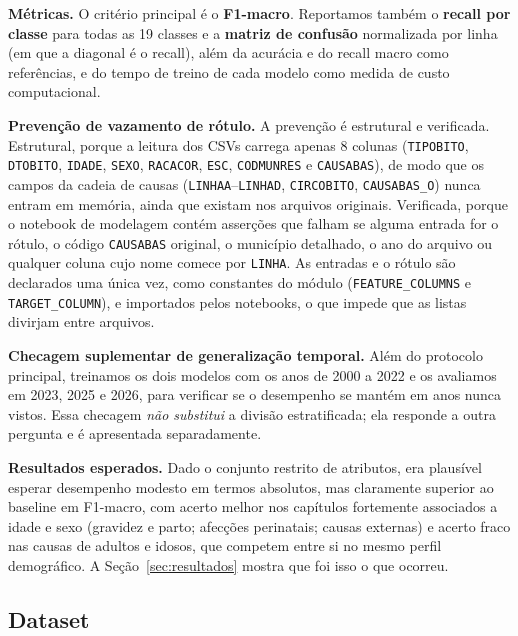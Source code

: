 \documentclass[12pt]{article}
\begin{document}
\textbf{Métricas.} O critério principal é o \textbf{F1-macro}. Reportamos
também o \textbf{recall por classe} para todas as 19 classes e a
\textbf{matriz de confusão} normalizada por linha (em que a diagonal é o
recall), além da acurácia e do recall macro como referências, e do tempo de
treino de cada modelo como medida de custo computacional.

\textbf{Prevenção de vazamento de rótulo.} A prevenção é estrutural e
verificada. Estrutural, porque a leitura dos CSVs carrega apenas 8 colunas
(\texttt{TIPOBITO}, \texttt{DTOBITO}, \texttt{IDADE}, \texttt{SEXO},
\texttt{RACACOR}, \texttt{ESC}, \texttt{CODMUNRES} e \texttt{CAUSABAS}), de
modo que os campos da cadeia de causas (\texttt{LINHAA}--\texttt{LINHAD},
\texttt{CIRCOBITO}, \texttt{CAUSABAS\_O}) nunca entram em memória, ainda que
existam nos arquivos originais. Verificada, porque o notebook de modelagem
contém asserções que falham se alguma entrada for o rótulo, o código
\texttt{CAUSABAS} original, o município detalhado, o ano do arquivo ou
qualquer coluna cujo nome comece por \texttt{LINHA}. As entradas e o rótulo
são declarados uma única vez, como constantes do módulo
(\texttt{FEATURE\_COLUMNS} e \texttt{TARGET\_COLUMN}), e importados pelos
notebooks, o que impede que as listas divirjam entre arquivos.

\textbf{Checagem suplementar de generalização temporal.} Além do protocolo
principal, treinamos os dois modelos com os anos de 2000 a 2022 e os
avaliamos em 2023, 2025 e 2026, para verificar se o desempenho se mantém em
anos nunca vistos. Essa checagem \emph{não substitui} a divisão estratificada;
ela responde a outra pergunta e é apresentada separadamente.

\textbf{Resultados esperados.} Dado o conjunto restrito de atributos, era
plausível esperar desempenho modesto em termos absolutos, mas claramente
superior ao baseline em F1-macro, com acerto melhor nos capítulos fortemente
associados a idade e sexo (gravidez e parto; afecções perinatais; causas
externas) e acerto fraco nas causas de adultos e idosos, que competem entre si
no mesmo perfil demográfico. A Seção~\ref{sec:resultados} mostra que foi isso
o que ocorreu.

\subsection{Dataset}
\label{sec:dataset}
\end{document}
